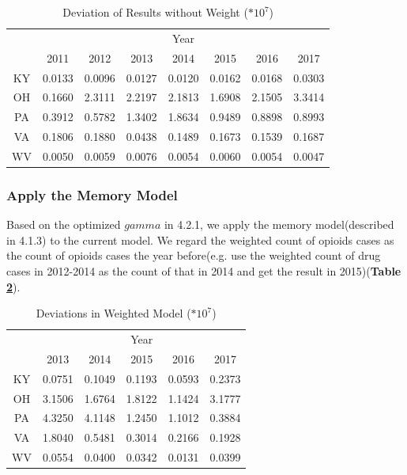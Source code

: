 \documentclass[12pt]{article}
\begin{document}
\begin{table}[h]
\centering
\begin{tabular}{cccccccc}
  \toprule
   & \multicolumn{7}{c}{Year} \\
  \cmidrule{2-8}
& 2011 & 2012 & 2013 & 2014 & 2015 & 2016 & 2017  \\
  \midrule
KY & 0.0133 & 0.0096 & 0.0127 & 0.0120 & 0.0162 & 0.0168 & 0.0303 \\
OH & 0.1660 & 2.3111 & 2.2197 & 2.1813 & 1.6908 & 2.1505 & 3.3414 \\
PA & 0.3912 & 0.5782 & 1.3402 & 1.8634  & 0.9489 &  0.8898 & 0.8993 \\
VA & 0.1806 & 0.1880 & 0.0438 & 0.1489 & 0.1673 & 0.1539 & 0.1687 \\
WV & 0.0050 & 0.0059 & 0.0076 & 0.0054 & 0.0060 & 0.0054 & 0.0047 \\
  \bottomrule
\end{tabular}
\caption{Deviation of Results without Weight ($*10^{7}$)}
\label{dev}
\end{table}

\subsubsection{Apply the Memory Model}
Based on the optimized $gamma$ in 4.2.1, we apply the memory model(described in 4.1.3) to the current model. We regard the weighted count of opioids cases as the count of opioids cases the year before(e.g. use the weighted count of drug cases in 2012-2014 as the count of that in 2014 and get the result in 2015)(\textbf{Table \ref{dev2}}).

\begin{table}[h]
\centering
\begin{tabular}{cccccc}
  \toprule
   & \multicolumn{5}{c}{Year} \\
  \cmidrule{2-6}
& 2013 & 2014 & 2015 & 2016 & 2017  \\
  \midrule
  KY & 0.0751 & 0.1049 & 0.1193 & 0.0593 & 0.2373 \\
  OH & 3.1506 & 1.6764 & 1.8122 & 1.1424 & 3.1777 \\
  PA & 4.3250 & 4.1148 & 1.2450 & 1.1012 & 0.3884 \\
  VA & 1.8040 & 0.5481 & 0.3014 & 0.2166 & 0.1928 \\
  WV & 0.0554 & 0.0400 & 0.0342 & 0.0131 & 0.0399 \\
  \bottomrule
\end{tabular}
\caption{Deviations in Weighted Model ($*10^{7}$)}
\label{dev2}
\end{table}
\end{document}
